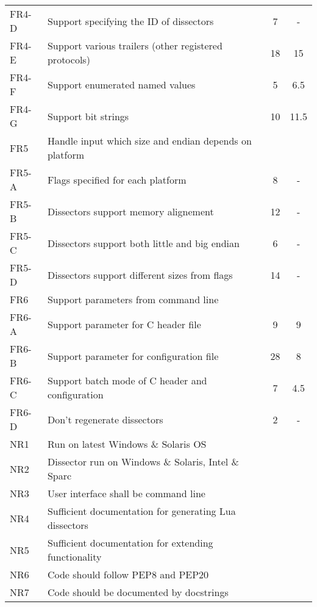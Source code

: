 \begin{table}[ht]
\begin{tabularx}{\textwidth}{l X c c}
	FR4-D & Support specifying the ID of dissectors & 7 & - \\
	FR4-E & Support various trailers (other registered protocols) & 18 & 15 \\
	FR4-F & Support enumerated named values  & 5 & 6.5 \\
	FR4-G & Support bit strings & 10 & 11.5 \\
	\addlinespace
	FR5 & Handle input which size and endian depends on platform & & \\
	FR5-A & Flags specified for each platform & 8 & - \\
	FR5-B & Dissectors support memory alignement & 12 & - \\
	FR5-C & Dissectors support both little and big endian & 6 & - \\
	FR5-D & Dissectors support different sizes from flags & 14 & - \\	
	\addlinespace
	FR6 & Support parameters from command line & & \\
	FR6-A & Support parameter for C header file & 9 & 9 \\
	FR6-B & Support parameter for configuration file & 28 & 8 \\
	FR6-C & Support batch mode of C header and configuration & 7 & 4.5 \\
	FR6-D & Don't regenerate dissectors & 2 & - \\
	\addlinespace
	NR1 & Run on latest Windows \& Solaris OS & & \\
	NR2 & Dissector run on Windows \& Solaris, Intel \& Sparc & & \\
	NR3 & User interface shall be command line & & \\
	NR4 & Sufficient documentation for generating Lua dissectors & & \\
	NR5 & Sufficient documentation for extending functionality & & \\
	NR6 & Code should follow PEP8 and PEP20 & & \\
	NR7 & Code should be documented by docstrings & & \\
	\bottomrule
\end{tabularx}
\end{table}


